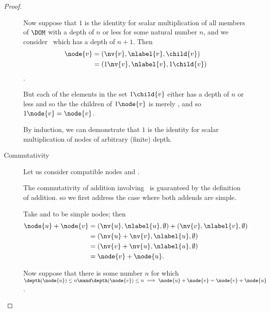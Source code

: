 \begin{proposition}
\begin{proof}
\begin{description}
      Now suppose that \(1\) is the identity for scalar multiplication
      of all members of $\DOM$ with a depth of \(n\) or less for some
      natural number \(n\), and we consider \ which has a
      depth of \(n+1\). Then
      \begin{align*}
          \node{v} &= (\nv{v}, \nlabel{v}, \child{v}) \\
          &=  (1 \nv{v}, \nlabel{v}, 1\child{v})
      \end{align*}.

      But each of the elements in the set \(1\child{v}\) either has a
      depth of \(n\) or less and so the the children of \(1 \node{v}\)
      is merely , and so \(1 \node{v} = \node{v}\).

      By induction, we can demonstrate that \(1\) is the 
      identity for scalar multiplication of nodes of arbitrary (finite) depth.



    \item[Commutativity]

      Let us consider compatible nodes  and .

      The commutativity of addition involving \tzerotree\ is
      guaranteed by the definition of addition. so we first address
      the case where both addends are simple.

      Take  and  to be simple nodes; then
      \begin{align*}
          \node{u} + \node{v} &= (\nv{u}, \nlabel{u}, \emptyset) + (\nv{v}, \nlabel{v}, \emptyset) \notag\\
          &= (\nv{u} + \nv{v}, \nlabel{u}, \emptyset) \notag\\
          &= (\nv{v} + \nv{u}, \nlabel{u}, \emptyset) \notag\\
          &= \node{v} + \node{u}.
      \end{align*}

      Now suppose that there is some number \(n\) for which
      \(\depth(\node{u}) \leq n \mand \depth(\node{v}) \leq n
      \implies \node{u} + \node{v} = \node{v} + \node{u}\).


\end{description}
\end{proof}
\end{proposition}
